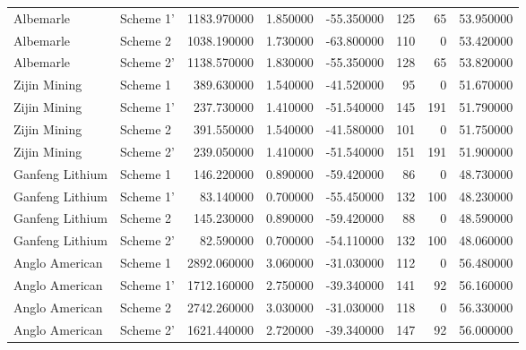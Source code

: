 \begin{longtable}{llrrrrrr}
Albemarle & Scheme 1' & 1183.970000 & 1.850000 & -55.350000 & 125 & 65 & 53.950000 \\
Albemarle & Scheme 2 & 1038.190000 & 1.730000 & -63.800000 & 110 & 0 & 53.420000 \\
Albemarle & Scheme 2' & 1138.570000 & 1.830000 & -55.350000 & 128 & 65 & 53.820000 \\
Zijin Mining & Scheme 1 & 389.630000 & 1.540000 & -41.520000 & 95 & 0 & 51.670000 \\
Zijin Mining & Scheme 1' & 237.730000 & 1.410000 & -51.540000 & 145 & 191 & 51.790000 \\
Zijin Mining & Scheme 2 & 391.550000 & 1.540000 & -41.580000 & 101 & 0 & 51.750000 \\
Zijin Mining & Scheme 2' & 239.050000 & 1.410000 & -51.540000 & 151 & 191 & 51.900000 \\
Ganfeng Lithium & Scheme 1 & 146.220000 & 0.890000 & -59.420000 & 86 & 0 & 48.730000 \\
Ganfeng Lithium & Scheme 1' & 83.140000 & 0.700000 & -55.450000 & 132 & 100 & 48.230000 \\
Ganfeng Lithium & Scheme 2 & 145.230000 & 0.890000 & -59.420000 & 88 & 0 & 48.590000 \\
Ganfeng Lithium & Scheme 2' & 82.590000 & 0.700000 & -54.110000 & 132 & 100 & 48.060000 \\
Anglo American & Scheme 1 & 2892.060000 & 3.060000 & -31.030000 & 112 & 0 & 56.480000 \\
Anglo American & Scheme 1' & 1712.160000 & 2.750000 & -39.340000 & 141 & 92 & 56.160000 \\
Anglo American & Scheme 2 & 2742.260000 & 3.030000 & -31.030000 & 118 & 0 & 56.330000 \\
Anglo American & Scheme 2' & 1621.440000 & 2.720000 & -39.340000 & 147 & 92 & 56.000000 \\
\end{longtable}
